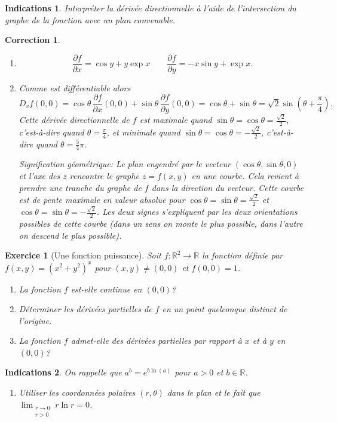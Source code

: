 \documentclass[11pt,a4paper]{article}
\newcommand{\Rr}{\mathbb{R}} \newcommand{\R}{\mathbb{R}}
\theoremstyle{exostyle}
\newtheorem{exo}{Exercice}
\newtheorem{ind}{Indications}
\newtheorem{cor}{Correction}
\newcommand{\exercice}[1]{} \newcommand{\finexercice}{}
\newcommand{\enonce}{\begin{exo}} \newcommand{\finenonce}{\end{exo}}
\newcommand{\indication}{\begin{ind}} \newcommand{\finindication}{\end{ind}}
\newcommand{\correction}{\begin{cor}} \newcommand{\fincorrection}{\end{cor}}
\begin{document}
\indication 
Interpréter la dérivée directionnelle à l'aide de l'intersection du graphe 
de la fonction avec un plan convenable.
\finindication

\correction
\begin{enumerate}  
	\item \[
	\frac{\partial f}{\partial x}=\cos y + y\exp x 
	\qquad
	\frac{\partial f}{\partial y}=-x\sin y + \exp x.
	\]
	
	\item Comme est différentiable alors 
	\[D_vf(0,0)=\cos \theta \,\frac{\partial f}{\partial x}(0,0)
	+\sin \theta \,\frac{\partial f}{\partial y}(0,0)
	=\cos \theta +\sin \theta = \sqrt2 \sin\left(\theta+\frac\pi4\right).\]
	Cette dérivée directionnelle de $f$ est maximale
	quand $\sin \theta = \cos \theta = \frac{\sqrt{2}}{2}$, c'est-à-dire quand
	$\theta =\frac \pi 4$,
	et minimale quand $\sin \theta = \cos \theta = -\frac{\sqrt{2}}{2}$, 
	c'est-à-dire quand  $\theta =\frac 54 \pi$.
	
	Signification géométrique:
	Le plan engendré par le vecteur $(\cos \theta,\sin \theta ,0)$ 
	et l'axe des $z$ rencontre le graphe $z=f(x,y)$ en une courbe.
	Cela revient à prendre une tranche du graphe de $f$ dans la direction du vecteur.
	Cette courbe est de pente maximale en valeur absolue pour
	$\cos \theta=\sin \theta=\frac{\sqrt{2}}{2}$ et
	$\cos \theta=\sin \theta=-\frac{\sqrt{2}}{2}$.
	Les deux signes s'expliquent par les deux orientations possibles de cette courbe
	(dans un sens on monte le plus possible, dans l'autre on descend le plus possible).
\end{enumerate}
\fincorrection
\finexercice


\exercice{2624, debievre, 2009/05/19}
\enonce[Une fonction puissance]
Soit $f:\R^2\rightarrow \R$ la fonction
définie par $f(x,y)=(x^2+y^2)^x$ pour $(x,y)\not=(0,0)$ et
$f(0,0)= 1$.
\begin{enumerate}
	\item La fonction $f$ est-elle continue en $(0,0)$?
	\item Déterminer les dérivées partielles de $f$ en un point
	quelconque distinct de l'origine.
	\item  La fonction $f$ admet-elle des dérivées partielles par
	rapport à $x$ et à $y$ en $(0,0)$?
\end{enumerate}
\finenonce

\indication 
On rappelle que $a^b = e^{b\ln(a)}$ pour $a>0$ et $b\in\Rr$.
\begin{enumerate} 
	\item Utiliser les coordonnées polaires $(r,\theta)$ dans le plan
	et le fait que $\lim_{\begin{smallmatrix} r \to 0\\ r >0
	\end{smallmatrix}} r \ln r =0$.
\end{enumerate}
\finindication
\end{document}
